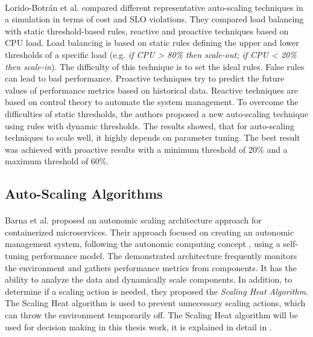 \paragraph{}
Lorido-Botrán et al.  \cite{Botran2013AutoScalingComp} compared different representative auto-scaling techniques in a simulation in terms of cost and SLO violations. They compared load balancing with static threshold-based rules, reactive and proactive techniques based on CPU load.
Load balancing is based on static rules defining the upper and lower thresholds of a specific load (e.g. \textit{if CPU > 80\% then scale-out; if CPU < 20\% then scale-in}). The difficulty of this technique is to set the ideal rules. False rules can lead to bad performance. Proactive techniques try to predict the future values of performance metrics based on historical data. Reactive techniques are based on control theory to automate the system management. To overcome the difficulties of static thresholds, the authors proposed a new auto-scaling technique using rules with dynamic thresholds. The results showed, that for auto-scaling techniques to scale well, it highly depends on parameter tuning. The best result was achieved with proactive results with a minimum threshold of 20\% and a maximum threshold of 60\%.


\subsection{Auto-Scaling Algorithms}
\paragraph{}Barna et al. \cite{Barna2017ElasticContainerApps} proposed an autonomic scaling architecture approach for containerized microservices. Their approach focused on creating an autonomic management system, following the autonomic computing concept \cite{Kephart2003VisionComputing}, using a self-tuning performance model. The demonstrated architecture frequently monitors the environment and gathers performance metrics from components. It has the ability to analyze the data and dynamically scale components. In addition, to determine if a scaling action is needed, they proposed the \textit{Scaling Heat Algorithm}. The Scaling Heat algorithm is used to prevent unnecessary scaling actions, which can throw the environment temporarily off.
The Scaling Heat algorithm will be used for decision making in this thesis work, it is explained in detail in .


